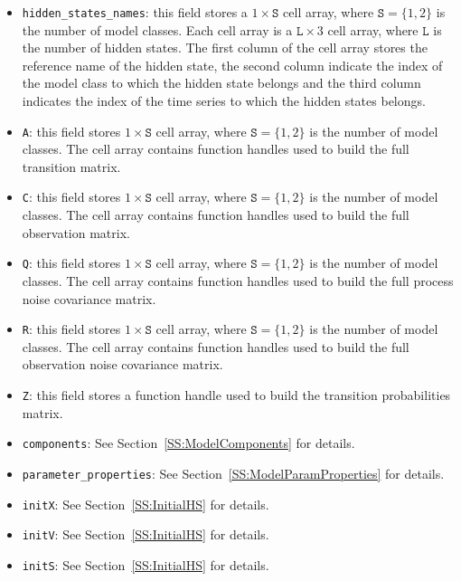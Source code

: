 {\begin{itemize}
\item \lstinline[basicstyle = \mlttfamily \small ]!hidden_states_names!:  this field stores a $1\times \mathtt{S}$ cell array, where $\mathtt{S} = \{1,2 \}$ is the number of model classes.
Each cell array is a $ \mathtt{L} \times 3$ cell array, where $\mathtt{L}$ is the number of hidden states. The first column of the cell array stores the reference name of the hidden state, the second column indicate the index of the model class to which the hidden state belongs and the third column indicates the index of the time series to which the hidden states belongs.
\item \lstinline[basicstyle = \mlttfamily \small ]!A!:  this field stores $1\times \mathtt{S}$ cell array, where $\mathtt{S} = \{1,2 \}$ is the number of model classes. The cell array contains function handles used to build the full transition matrix.
\item \lstinline[basicstyle = \mlttfamily \small ]!C!:  this field stores $1\times \mathtt{S}$ cell array, where $\mathtt{S} = \{1,2 \}$ is the number of model classes. The cell array contains function handles used to build the full observation matrix.
\item \lstinline[basicstyle = \mlttfamily \small ]!Q!: this field stores $1\times \mathtt{S}$ cell array, where $\mathtt{S} = \{1,2 \}$ is the number of model classes. The cell array contains function handles used to build the full process noise covariance matrix.
\item \lstinline[basicstyle = \mlttfamily \small ]!R!:  this field stores $1\times \mathtt{S}$ cell array, where $\mathtt{S} = \{1,2 \}$ is the number of model classes. The cell array contains function handles used to build the full observation noise covariance matrix.
\item \lstinline[basicstyle = \mlttfamily \small ]!Z!:  this field stores a function handle used to build the transition probabilities matrix.
\item \lstinline[basicstyle = \mlttfamily \small ]!components!:   See Section~\ref{SS:ModelComponents} for details.
\item \lstinline[basicstyle = \mlttfamily \small ]!parameter_properties!: See Section~\ref{SS:ModelParamProperties} for details.
\item \lstinline[basicstyle = \mlttfamily \small ]!initX!: See Section~\ref{SS:InitialHS} for details.
\item \lstinline[basicstyle = \mlttfamily \small ]!initV!: See Section~\ref{SS:InitialHS} for details.
\item \lstinline[basicstyle = \mlttfamily \small ]!initS!: See Section~\ref{SS:InitialHS} for details.
\end{itemize}


}
